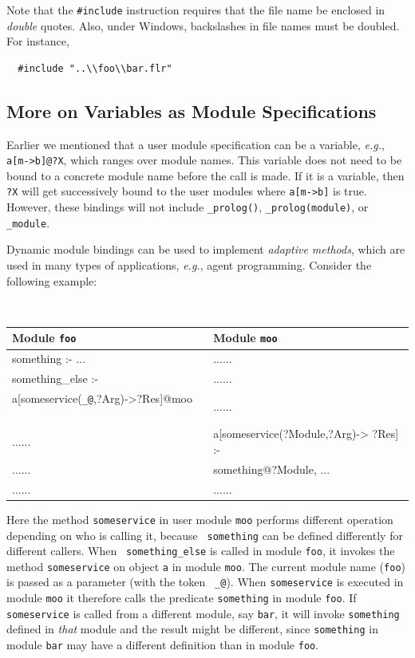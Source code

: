 \documentclass[11pt]{article}
\makeatletter
\newcommand{\thismodule}{{\tt \_@}\xspace}
\makeatother
\begin{document}
Note that the {\tt \#include} instruction requires that the file name be
enclosed in \emph{double} quotes.
Also, under Windows, backslashes in file names must be doubled. For
instance, 
\begin{verbatim}
  #include "..\\foo\\bar.flr"  
\end{verbatim}

\subsection{More on Variables as Module Specifications}

Earlier we mentioned that a user module specification can be a variable,
{\it e.g.}, {\tt a[m->b]@?X}, which ranges over module names. This variable
does not need to be bound to a concrete module name before the call is
made.  If it is a variable, then {\tt ?X} will get successively bound to the
user modules where {\tt a[m->b]} is true.  However, these bindings will not
include {\tt \_prolog()}, {\tt \_prolog(module)}, or {\tt \_module}.

Dynamic module bindings can be used to implement \emph{adaptive methods},
which are used in  many types of applications, {\it e.g.}, agent
programming. Consider the following example:
  \begin{center}
    {\tt
    \begin{tabular}{l l}
      Module {\tt foo}  & Module {\tt moo} \\
      \hline
      something :- ... & ......\\
      something\_else :- & ......\\
      \hspace*{1.5cm}a[someservice(\thismodule,?Arg)->?Res]@moo ~~& ......\\
      ...... & a[someservice(?Module,?Arg)-> ?Res] :- \\
      ...... & \hspace*{2.2cm} something@?Module, ...\\
      ...... & ......
      
    \end{tabular}
    }
  \end{center}
  
  Here the method {\tt someservice} in user module {\tt moo} performs
  different operation depending on who is calling it, because {\tt
    something} can be defined differently for different callers.  When {\tt
    something\_else} is called in module {\tt foo}, it invokes the method
  {\tt someservice} on object {\tt a} in module {\tt moo}. The current
  module name ({\tt foo}) is passed as a parameter (with the token {\tt
  \_@}). When {\tt someservice}
  is executed in module {\tt moo} it therefore calls the predicate {\tt something} in
  module {\tt foo}.
  If {\tt someservice} is called from a different module, say {\tt bar},  it will invoke
  {\tt something} defined in \emph{that} module and the result might be
  different, since {\tt something} in module {\tt bar} may have a different
  definition than in module {\tt foo}.      
  
\end{document}
